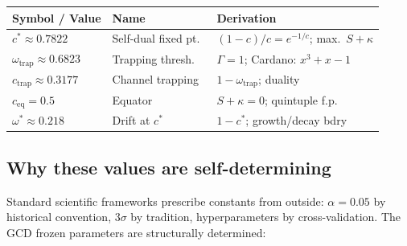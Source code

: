 \documentclass[
  aps,
  prd,
  twocolumn,
  superscriptaddress,
  nofootinbib,
  floatfix
]{revtex4-2}
\newcommand{\Gam}{\Gamma}
\begin{document}
\begin{center}
{\small\begin{tabular}{@{}llp{2.8cm}@{}}
\toprule
\textbf{Symbol / Value} & \textbf{Name} & \textbf{Derivation} \\
\midrule
$c^* \approx 0.7822$ & Self-dual fixed pt.\ & $(1{-}c)/c = e^{-1/c}$; max.\ $S+\kappa$ \\
$\omega_{\mathrm{trap}} \approx 0.6823$ & Trapping thresh.\ & $\Gam=1$; Cardano: $x^3{+}x{-}1$ \\
$c_{\mathrm{trap}} \approx 0.3177$ & Channel trapping & $1 - \omega_{\mathrm{trap}}$; duality \\
$c_{\mathrm{eq}} = 0.5$ & Equator & $S+\kappa=0$; quintuple f.p. \\
$\omega^* \approx 0.218$ & Drift at $c^*$ & $1-c^*$; growth/decay bdry \\
\bottomrule
\end{tabular}}
\end{center}

\subsection{Why these values are self-determining}

Standard scientific frameworks prescribe constants from outside:
$\alpha = 0.05$ by historical convention, $3\sigma$ by tradition,
hyperparameters by cross-validation.  The GCD frozen parameters are
structurally determined:
\end{document}
